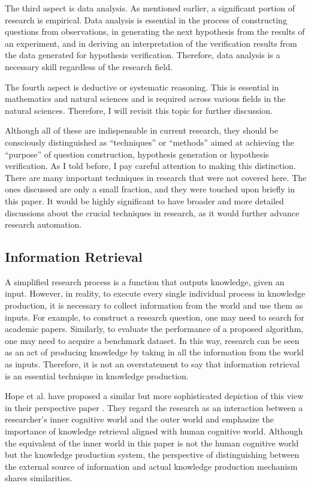 \documentclass{article}
\begin{document}
The third aspect is data analysis. As mentioned earlier, a significant portion of research is empirical. Data analysis is essential in the process of constructing questions from observations, in generating the next hypothesis from the results of an experiment, and in deriving an interpretation of the verification results from the data generated for hypothesis verification. Therefore, data analysis is a necessary skill regardless of the research field. 

The fourth aspect is deductive or systematic reasoning. This is essential in mathematics and natural sciences and is required across various fields in the natural sciences. Therefore, I will revisit this topic for further discussion. 

Although all of these are indispensable in current research, they should be consciously distinguished as ``techniques'' or ``methods'' aimed at achieving the ``purpose'' of question construction, hypothesis generation or hypothesis verification. As I told before, I pay careful attention to making this distinction. There are many important techniques in research that were not covered here. The ones discussed are only a small fraction, and they were touched upon briefly in this paper. It would be highly significant to have broader and more detailed discussions about the crucial techniques in research, as it would further advance research automation.

\subsection{Information Retrieval}
A simplified research process is a function that outputs knowledge, given an input. However, in reality, to execute every single individual process in knowledge production, it is necessary to collect information from the world and use them as inputs. For example, to construct a research question, one may need to search for academic papers. Similarly, to evaluate the performance of a proposed algorithm, one may need to acquire a benchmark dataset. In this way, research can be seen as an act of producing knowledge by taking in all the information from the world as inputs. Therefore, it is not an overstatement to say that information retrieval is an essential technique in knowledge production. 

Hope et al. have proposed a similar but more sophisticated depiction of this view in their perspective paper \cite{hope2022computational}. They regard the research as an interaction between a researcher’s inner cognitive world and the outer world and emphasize the importance of knowledge retrieval aligned with human cognitive world. Although the equivalent of the inner world in this paper is not the human cognitive world but the knowledge production system, the perspective of distinguishing between the external source of information and actual knowledge production mechanism shares similarities.
\end{document}
